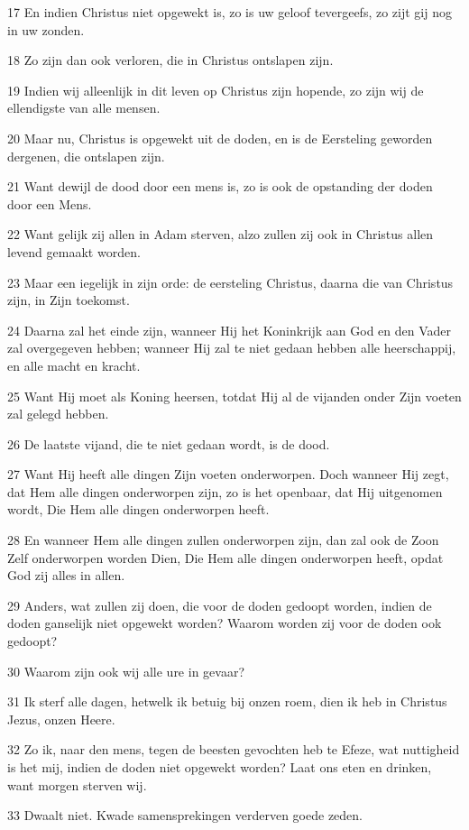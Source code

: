 \par 17 En indien Christus niet opgewekt is, zo is uw geloof tevergeefs, zo zijt gij nog in uw zonden.
\par 18 Zo zijn dan ook verloren, die in Christus ontslapen zijn.
\par 19 Indien wij alleenlijk in dit leven op Christus zijn hopende, zo zijn wij de ellendigste van alle mensen.
\par 20 Maar nu, Christus is opgewekt uit de doden, en is de Eersteling geworden dergenen, die ontslapen zijn.
\par 21 Want dewijl de dood door een mens is, zo is ook de opstanding der doden door een Mens.
\par 22 Want gelijk zij allen in Adam sterven, alzo zullen zij ook in Christus allen levend gemaakt worden.
\par 23 Maar een iegelijk in zijn orde: de eersteling Christus, daarna die van Christus zijn, in Zijn toekomst.
\par 24 Daarna zal het einde zijn, wanneer Hij het Koninkrijk aan God en den Vader zal overgegeven hebben; wanneer Hij zal te niet gedaan hebben alle heerschappij, en alle macht en kracht.
\par 25 Want Hij moet als Koning heersen, totdat Hij al de vijanden onder Zijn voeten zal gelegd hebben.
\par 26 De laatste vijand, die te niet gedaan wordt, is de dood.
\par 27 Want Hij heeft alle dingen Zijn voeten onderworpen. Doch wanneer Hij zegt, dat Hem alle dingen onderworpen zijn, zo is het openbaar, dat Hij uitgenomen wordt, Die Hem alle dingen onderworpen heeft.
\par 28 En wanneer Hem alle dingen zullen onderworpen zijn, dan zal ook de Zoon Zelf onderworpen worden Dien, Die Hem alle dingen onderworpen heeft, opdat God zij alles in allen.
\par 29 Anders, wat zullen zij doen, die voor de doden gedoopt worden, indien de doden ganselijk niet opgewekt worden? Waarom worden zij voor de doden ook gedoopt?
\par 30 Waarom zijn ook wij alle ure in gevaar?
\par 31 Ik sterf alle dagen, hetwelk ik betuig bij onzen roem, dien ik heb in Christus Jezus, onzen Heere.
\par 32 Zo ik, naar den mens, tegen de beesten gevochten heb te Efeze, wat nuttigheid is het mij, indien de doden niet opgewekt worden? Laat ons eten en drinken, want morgen sterven wij.
\par 33 Dwaalt niet. Kwade samensprekingen verderven goede zeden.
